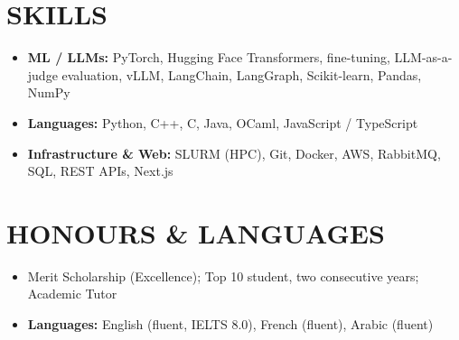 \documentclass[10pt, a4paper]{article}
\begin{document}
\section*{SKILLS}
\begin{itemize}
    \item \textbf{ML / LLMs:} PyTorch, Hugging Face Transformers, fine-tuning, LLM-as-a-judge evaluation, vLLM, LangChain, LangGraph, Scikit-learn, Pandas, NumPy
    \item \textbf{Languages:} Python, C++, C, Java, OCaml, JavaScript / TypeScript
    \item \textbf{Infrastructure \& Web:} SLURM (HPC), Git, Docker, AWS, RabbitMQ, SQL, REST APIs, Next.js
\end{itemize}

\section*{HONOURS \& LANGUAGES}
\begin{itemize}
    \item Merit Scholarship (Excellence); Top 10 student, two consecutive years; Academic Tutor
    \item \textbf{Languages:} English (fluent, IELTS 8.0), French (fluent), Arabic (fluent)
\end{itemize}
\end{document}

